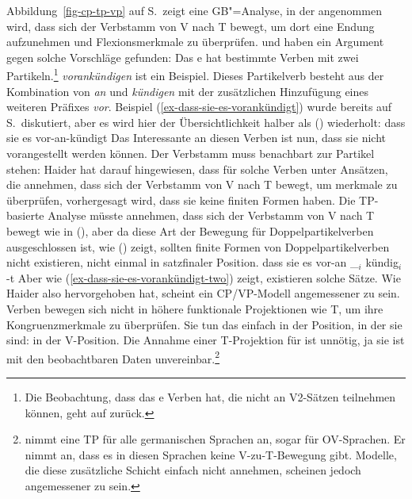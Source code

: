 Abbildung~\ref{fig-cp-tp-vp} auf S.\,\pageref{fig-cp-tp-vp} zeigt eine GB"=Analyse, in der angenommen wird, dass sich der Verbstamm von V nach T bewegt, um
dort eine Endung aufzunehmen und Flexionsmerkmale zu überprüfen. \textcites[]{Haider93a}[--60]{Haider2010a} und \citet[Abschnitt~3.3]{Vikner2001a} haben ein
Argument gegen solche Vorschläge gefunden: Das e hat bestimmte Verben mit zwei Partikeln.\footnote{%
  Die Beobachtung, dass das e Verben hat, die nicht an V2-Sätzen teilnehmen können, geht auf
  \citet{Hoehle91b}
zurück.
}
\emph{vorankündigen}
ist ein Beispiel. Dieses Partikelverb besteht aus der Kombination von \emph{an} und \emph{kündigen} mit
der zusätzlichen Hinzufügung eines weiteren Präfixes \emph{vor}. Beispiel
(\ref{ex-dass-sie-es-vorankündigt}) wurde bereits auf
S.\,\pageref{ex-dass-sie-es-vorankündigt} diskutiert, aber es wird hier der Übersichtlichkeit halber als () wiederholt:
\ea 
\label{ex-dass-sie-es-vorankündigt-two}
dass sie es vor-an-kündigt
\z
Das Interessante an diesen Verben ist nun, dass sie nicht vorangestellt werden können. Der Verbstamm muss
benachbart zur Partikel stehen:
\eal
{}
\zl
Haider hat darauf hingewiesen, dass für solche Verben unter Ansätzen, die annehmen, dass sich der Verbstamm von V nach T bewegt, um
merkmale zu überprüfen, vorhergesagt wird, dass sie keine finiten Formen haben.
Die TP-basierte Analyse müsste annehmen, dass sich der Verbstamm  von V nach T bewegt wie in (), aber
da diese Art der Bewegung für Doppelpartikelverben ausgeschlossen ist, wie () zeigt, sollten finite Formen
von Doppelpartikelverben nicht existieren, nicht einmal in satzfinaler Position.
\ea 
dass sie es vor-an \_$_i$ kündig$_i$ -t
\z
Aber wie (\ref{ex-dass-sie-es-vorankündigt-two}) zeigt, existieren solche Sätze. Wie Haider also
hervorgehoben hat, scheint ein CP/VP-Modell angemessener zu sein. Verben bewegen sich nicht in höhere funktionale Projektionen
wie T, um ihre Kongruenzmerkmale zu überprüfen. Sie tun das einfach in der Position, in der sie sind: in der V-Position. Die
Annahme einer T-Projektion für  ist unnötig, ja sie ist mit den
beobachtbaren Daten unvereinbar.\footnote{%
  \citet{Vikner2001a} nimmt eine TP für alle germanischen Sprachen an, sogar für OV-Sprachen. Er nimmt
  an, dass es in diesen Sprachen keine V-zu-T-Bewegung gibt. Modelle, die diese
  zusätzliche Schicht einfach nicht annehmen, scheinen jedoch angemessener zu sein.
}

